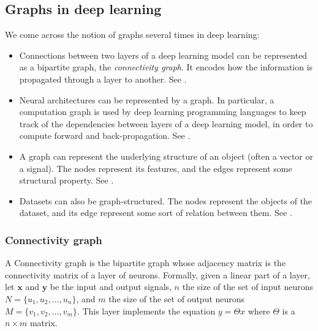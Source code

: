 \subsection{Graphs in deep learning}


We come across the notion of graphs several times in deep learning:
\begin{itemize}
\item Connections between two layers of a deep learning model can be represented as a bipartite graph, the \emph{connectivity graph}. It encodes how the information is propagated through a layer to another. See .
\item Neural architectures can be represented by a graph. In particular, a computation graph is used by deep learning programming languages to keep track of the dependencies between layers of a deep learning model, in order to compute forward and back-propagation. See .
\item A graph can represent the underlying structure of an object (often a vector or a signal). The nodes represent its features, and the edges represent some structural property. See .
\item Datasets can also be graph-structured. The nodes represent the objects of the dataset, and its edge represent some sort of relation between them. See .
\end{itemize}


\subsubsection{Connectivity graph}
\label{con_graph}

A Connectivity graph is the bipartite graph whose adjacency matrix is the connectivity matrix of a layer of neurons.
Formally, given a linear part of a layer, let $\textbf{x}$ and $\textbf{y}$ be the input and output signals, $n$ the size of the set of input neurons $N = \{u_1, u_2, \ldots, u_n\}$, and $m$ the size of the set of output neurons $M = \{v_1, v_2, \ldots, v_m\}$. This layer implements the equation $y = \Theta x$ where $\Theta$ is a $n \times m$ matrix.

